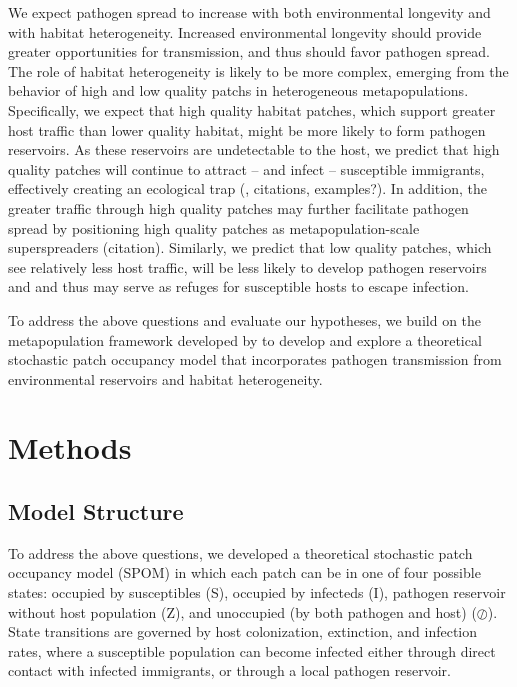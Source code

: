 \documentclass{svjour3}
\begin{document}
We expect pathogen spread to increase with both environmental longevity and with habitat heterogeneity.  Increased environmental longevity should provide greater opportunities for transmission, and thus should favor pathogen spread.  The role of habitat heterogeneity is likely to be more complex, emerging from the behavior of high and low quality patchs in heterogeneous metapopulations.  Specifically, we expect that high quality habitat patches, which support greater host traffic than lower quality habitat, might be more likely to form pathogen reservoirs.  As these reservoirs are undetectable to the host, we predict that high quality patches will continue to attract -- and infect -- susceptible immigrants, effectively creating an ecological trap (\cite{Almberg2011}, citations, examples?).  In addition, the greater traffic through high quality patches may further facilitate pathogen spread by positioning high quality patches as metapopulation-scale superspreaders (citation).  Similarly, we predict that low quality patches, which see relatively less host traffic, will be less likely to develop pathogen reservoirs and and thus may serve as refuges for susceptible hosts to escape infection.  

To address the above questions and evaluate our hypotheses, we build on the metapopulation framework developed by \cite{Hanski1994} to develop and explore a theoretical stochastic patch occupancy model that incorporates pathogen transmission from environmental reservoirs and habitat heterogeneity.   

\section{Methods}
\label{methods}

\subsection{Model Structure}
To address the above questions, we developed a theoretical stochastic patch occupancy model (SPOM) in which each patch can be in one of four possible states: occupied by susceptibles (S), occupied by infecteds (I), pathogen reservoir without host population (Z), and unoccupied (by both pathogen and host) ($\oslash$).  State transitions are governed by host colonization, extinction, and infection rates, where a susceptible population can become infected either through direct contact with infected immigrants, or through a local pathogen reservoir.  
\end{document}
